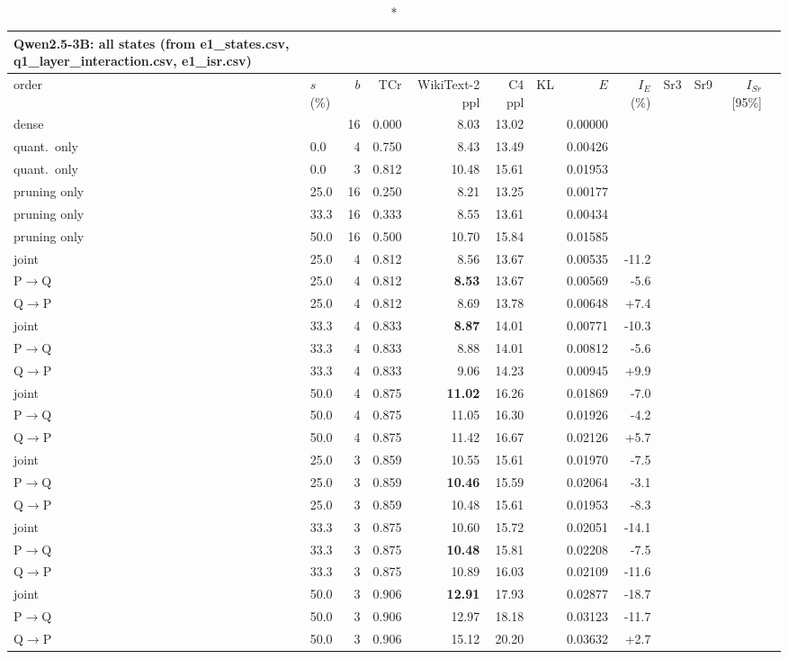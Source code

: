 \documentclass{article}
\begin{document}
\clearpage
\begin{longtable}{llrrrrrrrrrrl}
\caption*{\textbf{Qwen2.5-3B}: all states (from e1\_states.csv, q1\_layer\_interaction.csv, e1\_isr.csv)}\\
\toprule order & $s$ (\%) & $b$ & TCr & WikiText-2 ppl & C4 ppl & KL & $E$ & $I_E$ (\%) & Sr3 & Sr9 & $I_{Sr}$ [95\%] \\ \midrule \endhead
dense &  & 16 & 0.000 & 8.03 & 13.02 &  & 0.00000 &  &  &  &  \\
quant.\ only & 0.0 & 4 & 0.750 & 8.43 & 13.49 &  & 0.00426 &  &  &  &  \\
quant.\ only & 0.0 & 3 & 0.812 & 10.48 & 15.61 &  & 0.01953 &  &  &  &  \\
pruning only & 25.0 & 16 & 0.250 & 8.21 & 13.25 &  & 0.00177 &  &  &  &  \\
pruning only & 33.3 & 16 & 0.333 & 8.55 & 13.61 &  & 0.00434 &  &  &  &  \\
pruning only & 50.0 & 16 & 0.500 & 10.70 & 15.84 &  & 0.01585 &  &  &  &  \\
joint & 25.0 & 4 & 0.812 & 8.56 & 13.67 &  & 0.00535 & -11.2 &  &  &  \\
P$\to$Q & 25.0 & 4 & 0.812 & \textbf{8.53} & 13.67 &  & 0.00569 & -5.6 &  &  &  \\
Q$\to$P & 25.0 & 4 & 0.812 & 8.69 & 13.78 &  & 0.00648 & +7.4 &  &  &  \\
joint & 33.3 & 4 & 0.833 & \textbf{8.87} & 14.01 &  & 0.00771 & -10.3 &  &  &  \\
P$\to$Q & 33.3 & 4 & 0.833 & 8.88 & 14.01 &  & 0.00812 & -5.6 &  &  &  \\
Q$\to$P & 33.3 & 4 & 0.833 & 9.06 & 14.23 &  & 0.00945 & +9.9 &  &  &  \\
joint & 50.0 & 4 & 0.875 & \textbf{11.02} & 16.26 &  & 0.01869 & -7.0 &  &  &  \\
P$\to$Q & 50.0 & 4 & 0.875 & 11.05 & 16.30 &  & 0.01926 & -4.2 &  &  &  \\
Q$\to$P & 50.0 & 4 & 0.875 & 11.42 & 16.67 &  & 0.02126 & +5.7 &  &  &  \\
joint & 25.0 & 3 & 0.859 & 10.55 & 15.61 &  & 0.01970 & -7.5 &  &  &  \\
P$\to$Q & 25.0 & 3 & 0.859 & \textbf{10.46} & 15.59 &  & 0.02064 & -3.1 &  &  &  \\
Q$\to$P & 25.0 & 3 & 0.859 & 10.48 & 15.61 &  & 0.01953 & -8.3 &  &  &  \\
joint & 33.3 & 3 & 0.875 & 10.60 & 15.72 &  & 0.02051 & -14.1 &  &  &  \\
P$\to$Q & 33.3 & 3 & 0.875 & \textbf{10.48} & 15.81 &  & 0.02208 & -7.5 &  &  &  \\
Q$\to$P & 33.3 & 3 & 0.875 & 10.89 & 16.03 &  & 0.02109 & -11.6 &  &  &  \\
joint & 50.0 & 3 & 0.906 & \textbf{12.91} & 17.93 &  & 0.02877 & -18.7 &  &  &  \\
P$\to$Q & 50.0 & 3 & 0.906 & 12.97 & 18.18 &  & 0.03123 & -11.7 &  &  &  \\
Q$\to$P & 50.0 & 3 & 0.906 & 15.12 & 20.20 &  & 0.03632 & +2.7 &  &  &  \\
\bottomrule\end{longtable}
\end{document}
